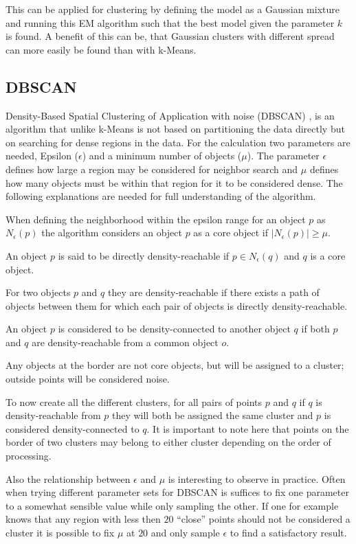 \documentclass[
	a4paper,
	english,
	twoside,
	openright,               
	11pt                            
	]{report}
\begin{document}
This can be applied for clustering by defining the model as a Gaussian mixture and running this EM algorithm such that the best model given the parameter $k$ is found. A benefit of this can be, that Gaussian clusters with different spread can more easily be found than with k-Means.

\subsection{DBSCAN}
Density-Based Spatial Clustering of Application with noise (DBSCAN) \cite{10.5555/3001460.3001507}, is an algorithm that unlike k-Means is not based on partitioning the data directly but on searching for dense regions in the data. For the calculation two parameters are needed, Epsilon ($\epsilon$) and a minimum number of objects ($\mu$). The parameter $\epsilon$ defines how large a region may be considered for neighbor search and $\mu$ defines how many objects must be within that region for it to be considered dense. The following explanations are needed for full understanding of the algorithm.

When defining the neighborhood within the epsilon range for an object $p$ as $N_\epsilon(p)$ the algorithm considers an object $p$ as a core object if $|N_\epsilon(p)|\geq \mu$.

An object $p$ is said to be directly density-reachable if $p\in N_\epsilon(q) $ and $q$ is a core object.

For two objects $p$ and $q$ they are density-reachable if there exists a path of objects between them for which each pair of objects is directly density-reachable.

An object $p$ is considered to be density-connected to another object $q$ if both $p$ and $q$ are density-reachable from a common object $o$.

Any objects at the border are not core objects, but will be assigned to a cluster; outside points will be considered noise.

To now create all the different clusters, for all pairs of points $p$ and $q$ if $q$ is density-reachable from $p$ they will both be assigned the same cluster and $p$ is considered density-connected to $q$. It is important to note here that points on the border of two clusters may belong to either cluster depending on the order of processing.

Also the relationship between $\epsilon$ and $\mu$ is interesting to observe in practice. Often when trying different parameter sets for DBSCAN is suffices to fix one parameter to a somewhat sensible value while only sampling the other. If one for example knows that any region with less then $20$ ``close'' points should not be considered a cluster it is possible to fix $\mu$ at $20$ and only sample $\epsilon$ to find a satisfactory result.
\end{document}
